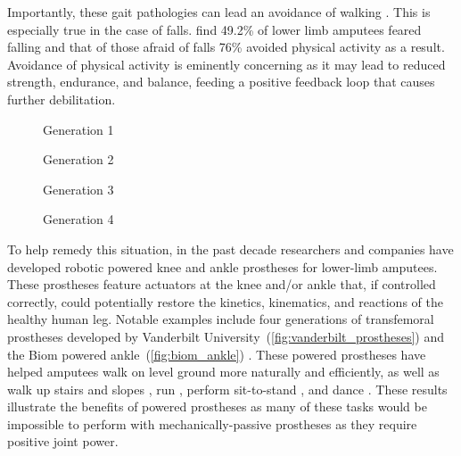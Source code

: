 Importantly, these gait pathologies can lead an avoidance of walking
\citep{gauthier1999enabling}. This is especially true in the case of falls.
\citet{miller2001prevalence} find 49.2\% of lower limb amputees feared falling
and that of those afraid of falls 76\% avoided physical activity as a result.
Avoidance of physical activity is eminently concerning as it may lead to reduced
strength, endurance, and balance, feeding a positive feedback loop that causes
further debilitation.

\begin{marginfigure}
    \centering
    \caption{Biom Robotic Ankle Prosthesis}
    \label{fig:biom_ankle}
\end{marginfigure}

\begin{figure*}[b]
    \centering
	\begin{subfigure}[b]{0.2\textwidth}
    	\centering
        \caption{Generation 1}
	\end{subfigure}
	\begin{subfigure}[b]{0.2\textwidth}
    	\centering
        \caption{Generation 2}
	\end{subfigure}
	\begin{subfigure}[b]{0.2\textwidth}
    	\centering
        \caption{Generation 3}
	\end{subfigure}
	\begin{subfigure}[b]{0.2\textwidth}
    	\centering
        \caption{Generation 4}
	\end{subfigure}
    \caption{Vanderbilt University's Robotic Transfemoral
    Prostheses.\vspace{0.1in}}
    \label{fig:vanderbilt_prostheses}
\end{figure*}

To help remedy this situation, in the past decade researchers and companies have
developed robotic powered knee and ankle prostheses for lower-limb amputees.
These prostheses feature actuators at the knee and/or ankle that, if controlled
correctly, could potentially restore the kinetics, kinematics, and reactions
of the healthy human leg. Notable examples include four generations of
transfemoral prostheses developed by Vanderbilt
University~(\cref{fig:vanderbilt_prostheses}) \citep{sup2007design,
sup2009preliminary, lawson2013control, lawson2014robotic} and the Biom powered
ankle~(\cref{fig:biom_ankle}) \citep{herr2012bionic}. These powered prostheses
have helped amputees walk on level ground more naturally and efficiently, as
well as walk up stairs and slopes \citep{sup2011upslope, lawson2013control}, run
\citep{huff2012running, shultz2015running}, perform sit-to-stand
\citep{varol2009powered}, and dance \citep{rouse2015design}. These results
illustrate the benefits of powered prostheses as many of these tasks would be
impossible to perform with mechanically-passive prostheses as they require
positive joint power.

